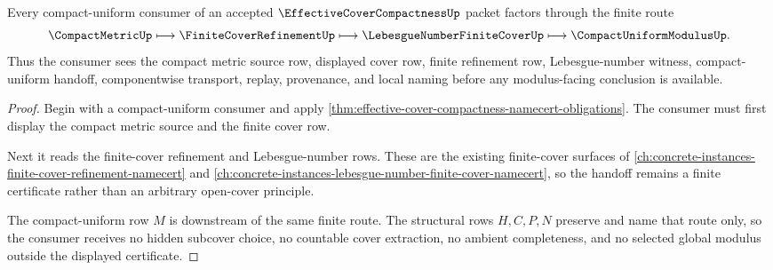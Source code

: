 \begin{theorem}
\label{thm:effective-cover-compactness-finite-cover-handoff}
Every compact-uniform consumer of an accepted $\EffectiveCoverCompactnessUp$ packet factors through the finite route
$$
\CompactMetricUp \longmapsto \FiniteCoverRefinementUp \longmapsto \LebesgueNumberFiniteCoverUp \longmapsto \CompactUniformModulusUp .
$$
Thus the consumer sees the compact metric source row, displayed cover row, finite refinement row, Lebesgue-number witness, compact-uniform handoff, componentwise transport, replay, provenance, and local naming before any modulus-facing conclusion is available.
\end{theorem}
\begin{proof}
Begin with a compact-uniform consumer and apply \autoref{thm:effective-cover-compactness-namecert-obligations}. The consumer must first display the compact metric source and the finite cover row.

Next it reads the finite-cover refinement and Lebesgue-number rows. These are the existing finite-cover surfaces of \autoref{ch:concrete-instances-finite-cover-refinement-namecert} and \autoref{ch:concrete-instances-lebesgue-number-finite-cover-namecert}, so the handoff remains a finite certificate rather than an arbitrary open-cover principle.

The compact-uniform row $M$ is downstream of the same finite route. The structural rows $H,C,P,N$ preserve and name that route only, so the consumer receives no hidden subcover choice, no countable cover extraction, no ambient completeness, and no selected global modulus outside the displayed certificate.
\end{proof}


\begin{closurestatus}{\EffectiveCoverCompactnessUp}
  \theoryclosure{\seedClosure}
  \formalstatus{\unformalizedV}
\end{closurestatus}
